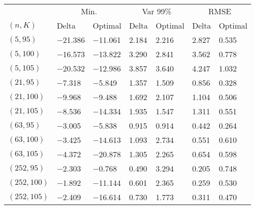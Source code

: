 \begin{tabular}{lllllll}
\toprule
& \multicolumn{2}{c}{Min.} & \multicolumn{2}{c}{Var 99\%} & \multicolumn{2}{c}{RMSE}\\
$(n,K)$& Delta & Optimal & Delta & Optimal & Delta & Optimal\\
\midrule
$(5,95)$ & \num{-21.386} & \num{-11.061} & \num{2.184} & \num{2.216} & \num{2.827} & \num{0.535}\\
$(5,100)$ & \num{-16.573} & \num{-13.822} & \num{3.290} & \num{2.841} & \num{3.562} & \num{0.778}\\
$(5,105)$ & \num{-20.532} & \num{-12.986} & \num{3.857} & \num{3.640} & \num{4.247} & \num{1.032}\\
$(21,95)$ & \num{-7.318} & \num{-5.849} & \num{1.357} & \num{1.509} & \num{0.856} & \num{0.328}\\
$(21,100)$ & \num{-9.968} & \num{-9.488} & \num{1.692} & \num{2.107} & \num{1.104} & \num{0.506}\\
$(21,105)$ & \num{-8.536} & \num{-14.334} & \num{1.935} & \num{1.547} & \num{1.311} & \num{0.551}\\
$(63,95)$ & \num{-3.005} & \num{-5.838} & \num{0.915} & \num{0.914} & \num{0.442} & \num{0.264}\\
$(63,100)$ & \num{-3.425} & \num{-14.613} & \num{1.093} & \num{2.734} & \num{0.551} & \num{0.610}\\
$(63,105)$ & \num{-4.372} & \num{-20.878} & \num{1.305} & \num{2.265} & \num{0.654} & \num{0.598}\\
$(252,95)$ & \num{-2.303} & \num{-0.768} & \num{0.490} & \num{3.294} & \num{0.205} & \num{0.748}\\
$(252,100)$ & \num{-1.892} & \num{-11.144} & \num{0.601} & \num{2.365} & \num{0.259} & \num{0.530}\\
$(252,105)$ & \num{-2.409} & \num{-16.614} & \num{0.730} & \num{1.773} & \num{0.311} & \num{0.470}\\
\bottomrule
\end{tabular}